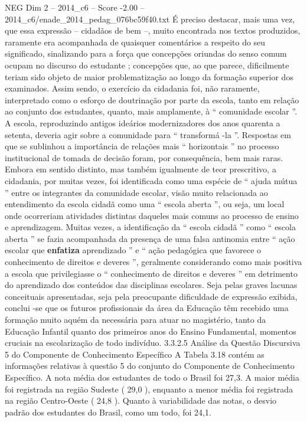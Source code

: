 \begin{textsample}{NEG Dim 2 – 2014\_c6 – Score -2.00 – 2014\_c6/enade\_2014\_pedag\_076bc59f40.txt}
É preciso destacar, mais uma vez, que essa expressão – cidadãos de bem –, muito encontrada nos textos produzidos, raramente era acompanhada de quaisquer comentários a respeito do seu significado, sinalizando para a força que concepções oriundas do senso comum ocupam no discurso do estudante ; concepções que, ao que parece, dificilmente teriam sido objeto de maior problematização ao longo da formação superior dos examinados.
Assim sendo, o exercício da cidadania foi, não raramente, interpretado como o esforço de doutrinação por parte da escola, tanto em relação ao conjunto dos estudantes, quanto, mais amplamente, à “ comunidade escolar ”.
A escola, reproduzindo antigos ideários modernizadores dos anos quarenta a setenta, deveria agir sobre a comunidade para “ transformá -la ”.
Respostas em que se sublinhou a importância de relações mais “ horizontais ” no processo institucional de tomada de decisão foram, por consequência, bem mais raras.
Embora em sentido distinto, mas também igualmente de teor prescritivo, a cidadania, por muitas vezes, foi identificada como uma espécie de “ ajuda mútua ” entre os integrantes da comunidade escolar, visão muito relacionada ao entendimento da escola cidadã como uma “ escola aberta ”, ou seja, um local onde ocorreriam atividades distintas daqueles mais comuns ao processo de ensino e aprendizagem.
Muitas vezes, a identificação da “ escola cidadã ” como “ escola aberta ” se fazia acompanhada da presença de uma falsa antinomia entre “ ação escolar que \textbf{enfatiza} aprendizado ” e “ ação pedagógica que favorece o conhecimento de direitos e deveres ”, geralmente considerando como mais positiva a escola que privilegiasse o “ conhecimento de direitos e deveres ” em detrimento do aprendizado dos conteúdos das disciplinas escolares.
Seja pelas graves lacunas conceituais apresentadas, seja pela preocupante dificuldade de expressão exibida, conclui -se que os futuros profissionais da área da Educação têm recebido uma formação muito aquém da necessária para atuar no magistério, tanto da Educação Infantil quanto dos primeiros anos do Ensino Fundamental, momentos cruciais na escolarização de todo indivíduo. 3.3.2.5 Análise da Questão Discursiva 5 do Componente de Conhecimento Específico A Tabela 3.18 contém as informações relativas à questão 5 do conjunto do Componente de Conhecimento Específico.
A nota média dos estudantes de todo o Brasil foi 27,3.
A maior média foi registrada na região Sudeste ( 29,0 ), enquanto a menor média foi registrada na região Centro-Oeste ( 24,8 ).
Quanto à variabilidade das notas, o desvio padrão dos estudantes do Brasil, como um todo, foi 24,1.

\end{textsample}

